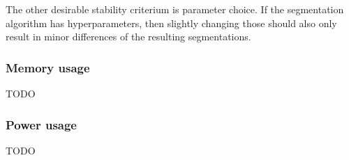The other desirable stability criterium is parameter choice. If the
segmentation algorithm has hyperparameters, then slightly changing those should
also only result in minor differences of the resulting segmentations.\cite{pantofaru2005comparison}

\subsubsection{Memory usage}

TODO

\subsubsection{Power usage}

TODO
